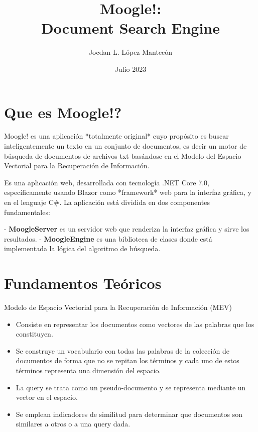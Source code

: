 \documentclass{beamer}
\title{Moogle!: \\ Document Search Engine}
\author{Jocdan L. López Mantecón}
\institute{Facultad de Matemática y Computación\\Universidad de la Habana}
\date{Julio 2023}
\begin{document}

\begin{frame}
	\maketitle 
\end{frame}


\section{Que es Moogle!?}\label{intro}


\begin{frame}
	Moogle! es una aplicación *totalmente original* cuyo propósito es buscar inteligentemente un texto en un conjunto de documentos, es decir un motor de búsqueda de documentos de archivos txt basándose en el Modelo del Espacio Vectorial para la Recuperación de Información.
	
	\pause
	
	Es una aplicación web, desarrollada con tecnología .NET Core 7.0, específicamente usando Blazor como *framework* web para la interfaz gráfica, y en el lenguaje C#.
	La aplicación está dividida en dos componentes fundamentales:
	
	- \textbf{MoogleServer} es un servidor web que renderiza la interfaz gráfica y sirve los resultados.
	- \textbf{MoogleEngine} es una biblioteca de clases donde está implementada la lógica del algoritmo de búsqueda.
\end{frame}

\section{Fundamentos Teóricos}\label{fundamentals}

\begin{frame}{Modelo de Espacio Vectorial para la Recuperación de Información (MEV)}
	 \begin{itemize}
		\item Consiste en representar los documentos como vectores de las palabras que los
		constituyen.
		\pause
		\item Se construye un vocabulario con todas las palabras de la colección de documentos
		de forma que no se repitan los términos y cada uno de estos términos representa una dimensión
		del espacio.
		\pause
		\item La query se trata como un pseudo-documento y se representa mediante un vector en el espacio. 
		\pause
		\item Se emplean indicadores de similitud para determinar que documentos son similares a otros o a una
		query dada.
	\end{itemize}
\end{frame}
\end{document}
